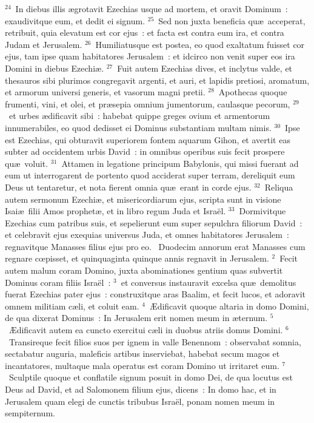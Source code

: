 ${}^{24}$~In diebus illis \ae grotavit Ezechias usque ad mortem, et oravit Dominum~: exaudivitque eum, et dedit ei signum.
${}^{25}$~Sed non juxta beneficia qu\ae\ acceperat, retribuit, quia elevatum est cor ejus~: et facta est contra eum ira, et contra Judam et Jerusalem.
${}^{26}$~Humiliatusque est postea, eo quod exaltatum fuisset cor ejus, tam ipse quam habitatores Jerusalem~: et idcirco non venit super eos ira Domini in diebus Ezechi\ae .
${}^{27}$~Fuit autem Ezechias dives, et inclytus valde, et thesauros sibi plurimos congregavit argenti, et auri, et lapidis pretiosi, aromatum, et armorum universi generis, et vasorum magni pretii.
${}^{28}$~Apothecas quoque frumenti, vini, et olei, et pr\ae sepia omnium jumentorum, caulasque pecorum,
${}^{29}$~et urbes \ae dificavit sibi~: habebat quippe greges ovium et armentorum innumerabiles, eo quod dedisset ei Dominus substantiam multam nimis.
${}^{30}$~Ipse est Ezechias, qui obturavit superiorem fontem aquarum Gihon, et avertit eas subter ad occidentem urbis David~: in omnibus operibus suis fecit prospere qu\ae\ voluit.
${}^{31}$~Attamen in legatione principum Babylonis, qui missi fuerant ad eum ut interrogarent de portento quod acciderat super terram, dereliquit eum Deus ut tentaretur, et nota fierent omnia qu\ae\ erant in corde ejus.
${}^{32}$~Reliqua autem sermonum Ezechi\ae , et misericordiarum ejus, scripta sunt in visione Isai\ae\ filii Amos prophet\ae , et in libro regum Juda et Isra\"el.
${}^{33}$~Dormivitque Ezechias cum patribus suis, et sepelierunt eum super sepulchra filiorum David~: et celebravit ejus exequias universus Juda, et omnes habitatores Jerusalem~: regnavitque Manasses filius ejus pro eo.
~Duodecim annorum erat Manasses cum regnare cœpisset, et quinquaginta quinque annis regnavit in Jerusalem.
${}^{2}$~Fecit autem malum coram Domino, juxta abominationes gentium quas subvertit Dominus coram filiis Isra\"el~:
${}^{3}$~et conversus instauravit excelsa qu\ae\ demolitus fuerat Ezechias pater ejus~: construxitque aras Baalim, et fecit lucos, et adoravit omnem militiam c\ae li, et coluit eam.
${}^{4}$~\AE dificavit quoque altaria in domo Domini, de qua dixerat Dominus~: In Jerusalem erit nomen meum in \ae ternum.
${}^{5}$~\AE dificavit autem ea cuncto exercitui c\ae li in duobus atriis domus Domini.
${}^{6}$~Transireque fecit filios suos per ignem in valle Benennom~: observabat somnia, sectabatur auguria, maleficis artibus inserviebat, habebat secum magos et incantatores, multaque mala operatus est coram Domino ut irritaret eum.
${}^{7}$~Sculptile quoque et conflatile signum posuit in domo Dei, de qua locutus est Deus ad David, et ad Salomonem filium ejus, dicens~: In domo hac, et in Jerusalem quam elegi de cunctis tribubus Isra\"el, ponam nomen meum in sempiternum.
